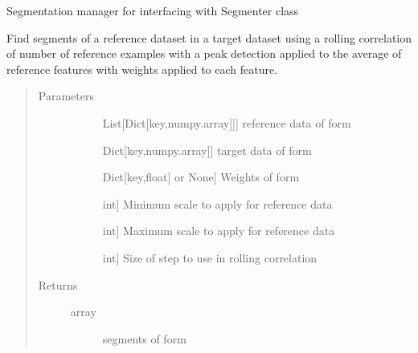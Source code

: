 \documentclass[letterpaper,10pt,english]{sphinxmanual}
\begin{document}
\begin{fulllineitems}
\sphinxAtStartPar
Segmentation manager for interfacing with Segmenter class

\sphinxAtStartPar
Find segments of a reference dataset in a target dataset using
a rolling correlation of  number of reference examples with
a peak detection applied to the average of  reference features
with weights applied to each feature.
\begin{quote}\begin{description}
\item[{Parameters}] \leavevmode\begin{description}
\item[{}] \leavevmode{[}List{[}Dict{[}key,numpy.array{]}{]}{]}
\sphinxAtStartPar
reference data of form

\item[{}] \leavevmode{[}Dict{[}key,numpy.array{]}{]}
\sphinxAtStartPar
target data of form

\item[{}] \leavevmode{[}Dict{[}key,float{]} or None{]}
\sphinxAtStartPar
Weights of form

\item[{}] \leavevmode{[}int{]}
\sphinxAtStartPar
Minimum scale to apply for reference data

\item[{}] \leavevmode{[}int{]}
\sphinxAtStartPar
Maximum scale to apply for reference data

\item[{}] \leavevmode{[}int{]}
\sphinxAtStartPar
Size of step to use in rolling correlation

\end{description}

\item[{Returns}] \leavevmode\begin{description}
\item[{ array}] \leavevmode
\sphinxAtStartPar
segments of form


\end{description}
\end{description}
\end{quote}
\end{fulllineitems}
\end{document}
